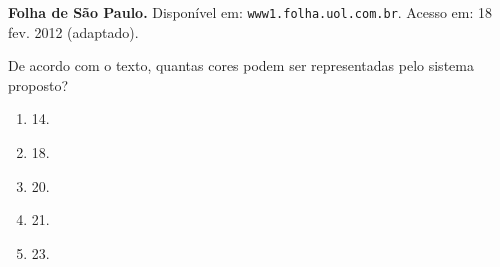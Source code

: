 \documentclass[12pt]{article}
\begin{document}
\begin{multicols}{2}
                \begin{flushright}
                \footnotesize
                \textbf{Folha de São Paulo.} Disponível em: \texttt{www1.folha.uol.com.br}. Acesso em: 18 fev. 2012 (adaptado).
                \end{flushright}

            De acordo com o texto, quantas cores podem ser representadas pelo sistema proposto?
            
                \begin{enumerate}[label=(\alph*), noitemsep]
	                \item 14.
	                \item 18.
	                \item 20.
	                \item 21.
	                \item 23.
                \end{enumerate}
		
		
	\end{multicols}
	
\end{document}
